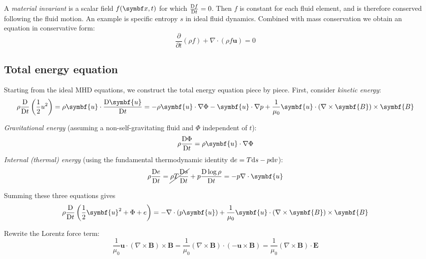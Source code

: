 \documentclass{jknotes}
\newcommand{\B}{\symbf{B}}
\renewcommand{\u}{\symbf{u}}
\begin{document}
A \emph{material invariant} is a scalar field $f(\x,t)$ for which
$\frac{\mathrm{D} f}{\mathrm{D} t} = 0$. Then $f$ is constant for each fluid element,
and is therefore conserved following the fluid motion. An example is specific
entropy $s$ in ideal fluid dynamics. Combined with mass conservation we obtain
an equation in conservative form:
\begin{equation}
	\frac{\partial}{\partial t}(\rho f) + \nabla \cdot (\rho f \u) = 0
\end{equation}

\subsection{Total energy equation}
Starting from the ideal MHD equations, we construct the total energy equation
piece by piece. First, consider \emph{kinetic energy}:
\begin{equation}
	\rho \frac{\diffD}{\diffD t}\left( \frac{1}{2}u^2\right) = \rho \u \cdot
	\frac{\diffD \u}{\diffD t} = - \rho \u \cdot \nabla \Phi - \u \cdot \nabla
	p + \frac{1}{\mu_0} \u \cdot (\nabla \times \B) \times \B
\end{equation}

\emph{Gravitational energy} (assuming a non-self-gravitating fluid and $\Phi$
independent of $t$):
\begin{equation}
	\rho \frac{\diffD \Phi}{\diffD t} = \rho \u \cdot \nabla \Phi
\end{equation}
\emph{Internal (thermal) energy} (using the fundamental thermodynamic identity
$\diffd e = T \diffd s - p \diffd v$):
\begin{equation}
	\rho \frac{\diffD e}{\diffD t} = \cancel{\rho T \frac{\diffD s}{\diffD t}}
	+ p \frac{\diffD \log \rho}{\diffD t} = - p \nabla \cdot \u
\end{equation}

Summing these three equations gives
\begin{equation}
	\rho \frac{\diffD}{\diffD t} \left( \frac{1}{2}\u^2 + \Phi + e\right) = -
	\nabla \cdot (p \u) + \frac{1}{\mu_0} \u \cdot (\nabla \times \B) \times
	\B
\end{equation}

Rewrite the Lorentz force term:
\begin{equation}
	\frac{1}{\mu_0} \u \cdot (\nabla \times \B) \times \B = \frac{1}{\mu_0}
	(\nabla \times \B) \cdot (-\u \times \B) = \frac{1}{\mu_0} (\nabla \times
	\B) \cdot \symbf{E}
\end{equation}
\end{document}
